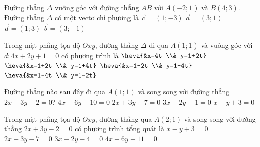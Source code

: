 	\begin{ex}%
		Đường thẳng $\Delta$ vuông góc với đường thẳng $AB$ với $A(-2;1)$ và $B(4;3)$. Đường thẳng $\Delta$ có một vectơ chỉ phương là
		\choice
		{\True $\overrightarrow{c}=(1;-3)$}
		{$\overrightarrow{a}=(3;1)$}
		{$\overrightarrow{d}=(1;3)$}
		{$\overrightarrow{b}=(3;-1)$}
	\end{ex}
	\begin{ex}%
		Trong mặt phẳng tọa độ $Oxy$, đường thẳng $\Delta$ đi qua $A(1;1)$ và vuông góc với $d \colon 4x+2y+1=0$ có phương trình là
		\choice
		{$\heva{&x=4t \\& y=1+2t}$}
		{$\heva{&x=1+2t \\& y=1+4t}$}
		{$\heva{&x=1-2t \\& y=1-4t}$}
		{\True $\heva{&x=1-4t \\& y=1-2t}$}
	\end{ex}
	\begin{ex}%
		Đường thẳng nào sau đây đi qua $A(1;1)$ và song song với đường thẳng $2x+3y-2=0$?
		\choice
		{\True $4x+6y-10=0$}
		{$2x+3y-7=0$}
		{$3x-2y-1=0$}
		{$x-y+3=0$}
	\end{ex}
	\begin{ex}%
		Trong mặt phẳng tọa độ $Oxy$, đường thẳng qua $A(2;1)$ và song song với đường thẳng $2x+3y-2=0$ có phương trình tổng quát là
		\choice
		{$x-y+3=0$}
		{\True $2x+3y-7=0$}
		{$3x-2y-4=0$}
		{$4x+6y-11=0$}
	\end{ex}
